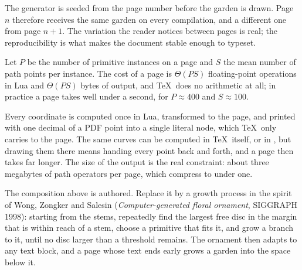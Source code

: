 \startremark[title={Procedural is not random}]
The generator is seeded from the page number before the garden is drawn. Page $n$
therefore receives the same garden on every compilation, and a different one from page
$n+1$. The variation the reader notices between pages is real; the reproducibility is what
makes the document stable enough to typeset.
\stopremark

\startproposition
Let $P$ be the number of primitive instances on a page and $S$ the mean number of path
points per instance. The cost of a page is $\Theta(PS)$ floating-point operations in Lua and
$\Theta(PS)$ bytes of output, and \TeX\ does no arithmetic at all; in practice a page takes
well under a second, for $P\approx 400$ and $S\approx 100$.
\stopproposition

Every coordinate is computed once in Lua, transformed to the page, and printed with one
decimal of a PDF point into a single literal node, which \TeX\ only carries to the page.
The same curves can be computed in \TeX\ itself, or in \METAPOST, but drawing them there
means handing every point back and forth, and a page then takes far longer. The size of
the output is the real constraint: about three megabytes of path operators per page, which
compress to under one.
\stopproof

\startexercise
The composition above is authored. Replace it by a growth process in the spirit of Wong,
Zongker and Salesin (\emph{Computer-generated floral ornament}, SIGGRAPH 1998): starting
from the stems, repeatedly find the largest free disc in the margin that is within reach of
a stem, choose a primitive that fits it, and grow a branch to it, until no disc larger than
a threshold remains. The ornament then adapts to any text block, and a page whose text
ends early grows a garden into the space below it.
\stopexercise
